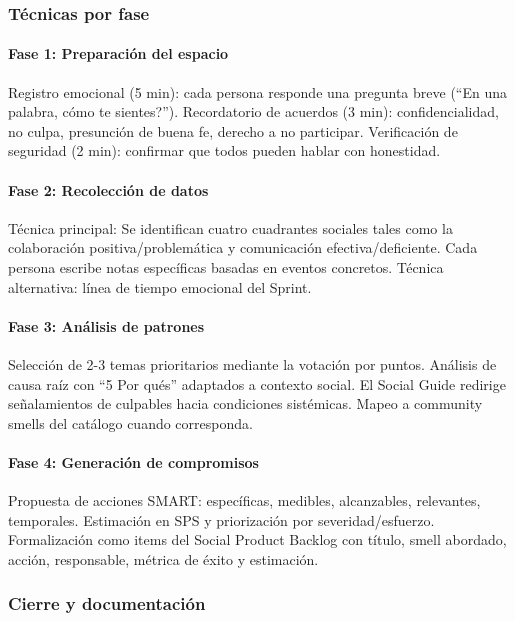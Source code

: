 \FloatBarrier

\subsubsection{Técnicas por fase}

\paragraph{Fase 1: Preparación del espacio}

Registro emocional (5 min): cada persona responde una pregunta breve (``En una palabra, \textquestiondown cómo te sientes?''). Recordatorio de acuerdos (3 min): confidencialidad, no culpa, presunción de buena fe, derecho a no participar. Verificación de seguridad (2 min): confirmar que todos pueden hablar con honestidad.

\paragraph{Fase 2: Recolección de datos}
Técnica principal: Se identifican cuatro cuadrantes sociales tales como la colaboración positiva/problemática y comunicación efectiva/deficiente. Cada persona escribe notas específicas basadas en eventos concretos. Técnica alternativa: línea de tiempo emocional del Sprint.

\paragraph{Fase 3: Análisis de patrones}

Selección de 2-3 temas prioritarios mediante la votación por puntos. Análisis de causa raíz con ``5 Por qués'' adaptados a contexto social. El Social Guide redirige señalamientos de culpables hacia condiciones sistémicas. Mapeo a community smells del catálogo cuando corresponda.

\paragraph{Fase 4: Generación de compromisos}

Propuesta de acciones SMART: específicas, medibles, alcanzables, relevantes, temporales. Estimación en SPS y priorización por severidad/esfuerzo. Formalización como items del Social Product Backlog con título, smell abordado, acción, responsable, métrica de éxito y estimación.

\subsubsection{Cierre y documentación}

